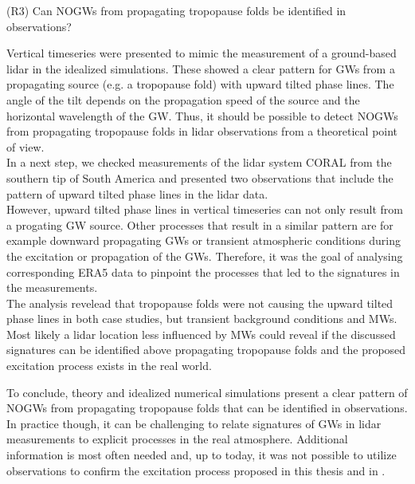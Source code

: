 \begin{tcolorbox}[]
    (R3) Can NOGWs from propagating tropopause folds be identified in observations?
\end{tcolorbox}

Vertical timeseries were presented to mimic the measurement of a ground-based lidar in the idealized simulations. These showed a clear pattern for GWs from a propagating source (e.g. a tropopause fold) with upward tilted phase lines. The angle of the tilt depends on the propagation speed of the source and the horizontal wavelength of the GW. Thus, it should be possible to detect NOGWs from propagating tropopause folds in lidar observations from a theoretical point of view. \\
In a next step, we checked measurements of the lidar system CORAL from the southern tip of South America and presented two observations that include the pattern of upward tilted phase lines in the lidar data. \\
However, upward tilted phase lines in vertical timeseries can not only result from a progating GW source. Other processes that result in a similar pattern are for example downward propagating GWs or transient atmospheric conditions during the excitation or propagation of the GWs. Therefore, it was the goal of analysing corresponding ERA5 data to pinpoint the processes that led to the signatures in the measurements. \\
The analysis revelead that tropopause folds were not causing the upward tilted phase lines in both case studies, but transient background conditions and MWs. Most likely a lidar location less influenced by MWs could reveal if the discussed signatures can be identified above propagating tropopause folds and the proposed excitation process exists in the real world.

To conclude, theory and idealized numerical simulations present a clear pattern of NOGWs from propagating tropopause folds that can be identified in observations. In practice though, it can be challenging to relate signatures of GWs in lidar measurements to explicit processes in the real atmosphere. Additional information is most often needed and, up to today, it was not possible to utilize observations to confirm the excitation process proposed in this thesis and in \textcite[]{dornbrack_stratospheric_2022}.

